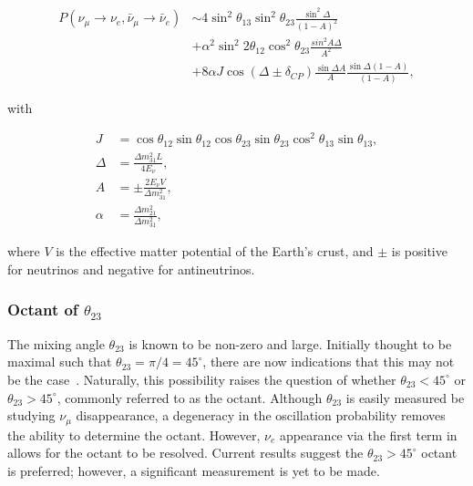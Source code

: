 \begin{align} %
    P(\nu_{\mu}\rightarrow\nu_{e},\bar{\nu}_{\mu}\rightarrow\bar{\nu}_{e})
     & \sim4\sin^{2}\theta_{13}\sin^{2}\theta_{23}\frac{\sin^{2}\Delta}{(1-A)^{2}} \nonumber     \\
     & + \alpha^{2}\sin^{2}2\theta_{12}\cos^{2}\theta_{23}\frac{sin^{2}A\Delta}{A^{2}} \nonumber \\
     & + 8\alpha J\cos(\Delta\pm\delta_{CP})\frac{\sin\Delta A}{A}\frac{\sin\Delta(1-A)}{(1-A)},
    \label{eq:chips_prob}
\end{align}

with

\begin{align} %
    J      & = \cos\theta_{12}\sin\theta_{12}\cos\theta_{23}
    \sin\theta_{23}\cos^{2}\theta_{13}\sin\theta_{13},       \\
    \Delta & = \frac{\Delta m^{2}_{31}L}{4E_{\nu}},          \\
    A      & = \pm\frac{2E_{\nu}V}{\Delta m^{2}_{31}},       \\
    \alpha & = \frac{\Delta m^{2}_{21}}{\Delta m^{2}_{31}},
    \label{eq:chips_prob_parts}
\end{align}

where $V$ is the effective matter potential of the Earth's crust, and $\pm$ is positive for
neutrinos and negative for antineutrinos.

\subsubsection*{Octant of $\theta_{23}$} %

The mixing angle $\theta_{23}$ is known to be non-zero and large. Initially thought to be maximal
such that $\theta_{23}=\pi/4=45^{\circ}$, there are now indications that this may not be the
case~\cite{acero2019}. Naturally, this possibility raises the question of whether
$\theta_{23}<45^{\circ}$ or $\theta_{23}>45^{\circ}$, commonly referred to as the octant. Although
$\theta_{23}$ is easily measured be studying $\nu_{\mu}$ disappearance, a degeneracy in the
oscillation probability removes the ability to determine the octant. However, $\nu_{e}$ appearance
via the first term in  allows for the octant to be resolved. Current
results suggest the $\theta_{23}>45^{\circ}$ octant is preferred; however, a significant
measurement is yet to be made.

